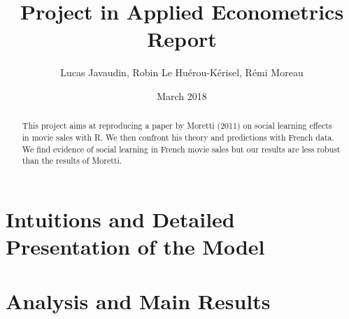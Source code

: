 \documentclass{article}
\title{Project in Applied Econometrics\\ Report}
\author{Lucas Javaudin, Robin Le Huérou-Kérisel, Rémi Moreau}
\date{March 2018}
\begin{document}
\maketitle

%
%
%
%
%
\begin{abstract}
	This project aims at reproducing a paper by Moretti (2011) on social learning effects in movie sales with R. We then confront his theory and predictions with French data. We find evidence of social learning in French movie sales but our results are less robust than the results of Moretti.
\end{abstract}
\tableofcontents
\pagebreak
\section{Intuitions and Detailed Presentation of the Model}


\pagebreak
\section{Analysis and Main Results}




\end{document}
